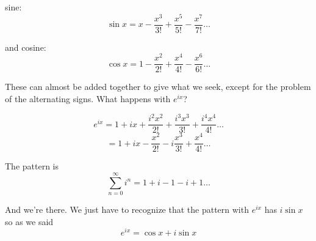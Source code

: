 \documentclass[11pt, oneside]{article}
\begin{document}
sine:
\[ \sin x = x - \frac{x^3}{3!} + \frac{x^5}{5!} - \frac{x^7}{7!} \dots \]

and cosine:
\[ \cos x = 1 - \frac{x^2}{2!} + \frac{x^4}{4!} - \frac{x^6}{6!} \dots \]

These can almost be added together to give what we seek, except for the problem of the alternating signs.  What happens with $e^{ix}$?

\[ e^{ix} =  1 + ix + \frac{i^2x^2}{2!} + \frac{i^3x^3}{3!} + \frac{i^4x^4}{4!} \dots \]
\[ = 1 + ix - \frac{x^2}{2!} - i  \frac{x^3}{3!} + \frac{x^4}{4!} \dots \]

The pattern is 
\[  \sum_{n=0}^{\infty} i^n = 1 + i - 1 - i + 1 \dots \]

And we're there.  We just have to recognize that the pattern with $e^{ix}$ has $i \sin x$ so as we said
\[ e^{ix} = \cos x + i \sin x \]
\end{document}
